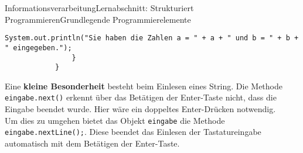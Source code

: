\documentclass[11pt,oneside,openany,headings=optiontotoc,11pt,numbers=noenddot]{article}
\begin{document}
\begin{worksheet}{Informationsverarbeitung}{Lernabschnitt: Strukturiert Programmieren}{Grundlegende Programmierelemente}
\begin{lstlisting}[style=JavaInputStyle]
					System.out.println("Sie haben die Zahlen a = " + a + " und b = " + b + " eingegeben.");
				}
			}
		\end{lstlisting}
		\par\noindent
		Eine \textbf{kleine Besonderheit} besteht beim Einlesen eines String. Die Methode \lstinline[style=JavaInputStyle]|eingabe.next()| erkennt über das Betätigen der Enter-Taste nicht, dass die Eingabe beendet wurde. Hier wäre ein doppeltes Enter-Drücken notwendig.\\
		Um dies zu umgehen bietet das Objekt \lstinline[style=JavaInputStyle]|eingabe| die Methode \lstinline[style=JavaInputStyle]|eingabe.nextLine();|. Diese beendet das Einlesen der Tastatureingabe automatisch mit dem Betätigen der Enter-Taste.
	\end{worksheet}
\end{document}
